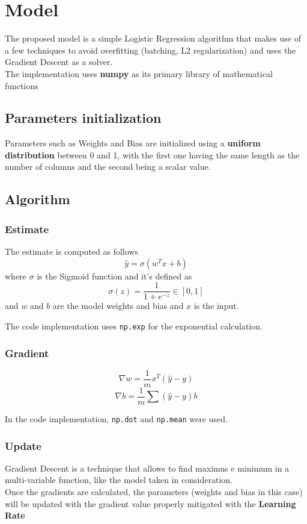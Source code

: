 \documentclass[
	letterpaper, %
	10pt, %
]{class}
\begin{document}
\section{Model}

The proposed model is a simple Logistic Regression \cite{logistic} algorithm that makes use of a few techniques to avoid overfitting (batching, L2 regularization) and uses the Gradient Descent as a solver.\\
The implementation uses \textbf{numpy} \cite{numpy} as its primary library of mathematical functions

\subsection{Parameters initialization}
Parameters such as Weights and Bias are initialized using a \textbf{uniform distribution} between 0 and 1, with the first one having the same length as the number of columns and the second being a scalar value.

\subsection{Algorithm}

\subsubsection{Estimate}
The estimate is computed as follows
$$ \hat{y} = \sigma(w^Tx + b) $$
where $\sigma$ is the Sigmoid function \cite{sigmoid} and it's defined as
$$ \sigma(z) = \frac{1}{1 + e^{-z}} \in [0,1] $$
and $w$ and $b$ are the model weights and bias and $x$ is the input.

The code implementation uses \texttt{np.exp} for the exponential calculation.

\subsubsection{Gradient}

$$ \nabla w = \frac{1}{m}x^T(\hat{y} - y) $$
$$ \nabla b = \frac{1}{m}\sum(\hat{y} - y) b $$

In the code implementation, \texttt{np.dot} and \texttt{np.mean} were used.

\subsubsection{Update}

Gradient Descent \cite{sgd} is a technique that allows to find maximus e minimum in a multi-variable function, like the model taken in consideration.\\
Once the gradients are calculated, the parameters (weights and bias in this case) will be updated with the gradient value properly mitigated with the \textbf{Learning Rate}
\end{document}
